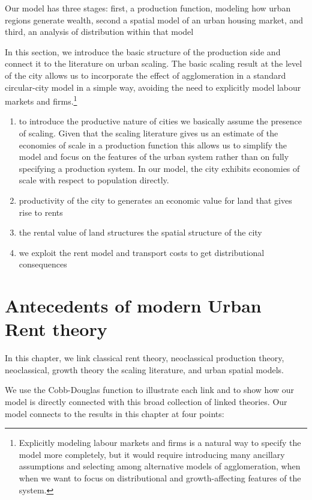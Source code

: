 Our model has three stages: first, a production function, modeling how urban regions generate wealth,  second a spatial model of an urban housing market, and third, an analysis of distribution within that model 

In this section, we introduce the basic structure of the production side and connect it to the literature on urban scaling. The basic scaling result at the level of the city allows us to incorporate the effect of agglomeration in a standard  circular-city model in a simple way, avoiding the need to explicitly model labour markets and firms.\footnote{Explicitly modeling labour markets and firms is a natural way to specify the model more completely, but it would require introducing many ancillary assumptions and selecting among alternative models of agglomeration, when when we want to focus on distributional and growth-affecting features of the system.}

\begin{enumerate}
    \item to introduce  the productive nature of cities we basically assume the presence of scaling. Given  that the scaling literature gives us an estimate of the economies of scale in a production function this allows us to simplify the model and focus on the features of the urban system rather than on fully specifying a production system. In our model, the city  exhibits economies of scale with respect to population directly. 

     \item  productivity of the city to generates an economic value for land that gives rise to rents

    \item  the rental value of land structures the spatial structure of the city

    \item we exploit the rent model and transport costs to get  distributional consequences
\end{enumerate}

\color{red}
\chapter{Antecedents of modern Urban Rent theory}
In this chapter, we link classical rent theory, neoclassical production theory, neoclassical, growth theory the scaling literature,  and urban spatial models. 

We use the Cobb-Douglas function %
to illustrate each link and to show how our  model is directly connected with this broad collection of linked theories. Our model connects to the results in this chapter at four points:



